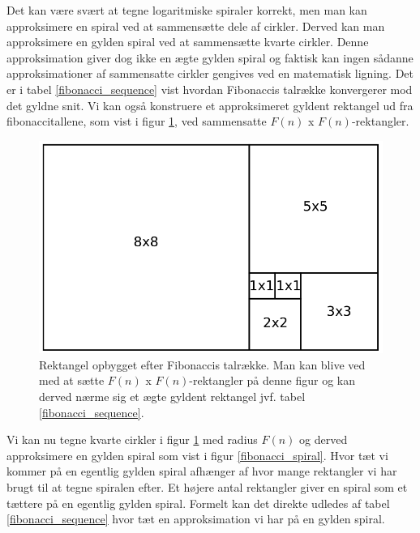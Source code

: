 {Det kan være svært at tegne logaritmiske spiraler korrekt, men man kan
approksimere en spiral ved at sammensætte dele af cirkler. Derved kan
man approksimere en gylden spiral ved at sammensætte kvarte cirkler.
Denne approksimation giver dog ikke en ægte gylden spiral og faktisk kan
ingen sådanne approksimationer af sammensatte cirkler gengives ved en
matematisk ligning\cite{Sharp2002}. Det er i tabel
\ref{fibonacci_sequence} vist hvordan Fibonaccis talrække konvergerer
mod det gyldne snit. Vi kan også konstruere et approksimeret gyldent
rektangel ud fra fibonaccitallene, som vist i figur
\ref{fibonacci_rektangel}, ved sammensatte $F(n)$ x $F(n)$-rektangler.
\begin{figure}[h!]
	\begin{center}
		\includegraphics[scale=0.35,angle=0]{afsnit/baggrund/billeder/fib_rect}
	\end{center}
	\caption[Rektangel opbygget efter Fibonaccis talrække]{Rektangel
	opbygget efter Fibonaccis talrække. Man kan blive ved med at
	sætte $F(n)$ x $F(n)$-rektangler på denne figur og kan derved
	nærme sig et ægte gyldent rektangel jvf. tabel
	\ref{fibonacci_sequence}.}
	\label{fibonacci_rektangel}
\end{figure}
Vi kan nu tegne kvarte cirkler i figur \ref{fibonacci_rektangel} med
radius $F(n)$ og derved approksimere en gylden spiral som vist i figur
\ref{fibonacci_spiral}. Hvor tæt vi kommer på en egentlig gylden spiral
afhænger af hvor mange rektangler vi har brugt til at tegne spiralen
efter. Et højere antal rektangler giver en spiral som et tættere på en
egentlig gylden spiral. Formelt kan det direkte udledes af tabel
\ref{fibonacci_sequence} hvor tæt en approksimation vi har på en gylden
spiral.
\begin{figure}[h!]
	\begin{center}

\end{center}
\end{figure}}
